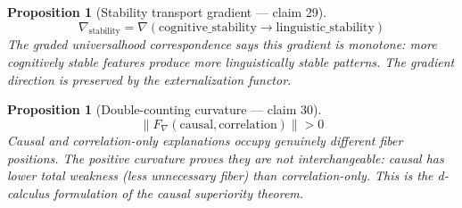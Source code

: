 \documentclass[11pt,a4paper]{article}
\newtheorem{proposition}[definition]{Proposition}
\begin{document}
\begin{proposition}[Stability transport gradient --- claim 29]
\label{prop:stability}
\[
  \nabla_{\text{stability}} = \nabla\left(\text{cognitive\_stability}
    \to \text{linguistic\_stability}\right)
\]
The graded universalhood correspondence says this gradient is monotone:
more cognitively stable features produce more linguistically stable
patterns. The gradient direction is preserved by the externalization
functor.
\end{proposition}

\begin{proposition}[Double-counting curvature --- claim 30]
\label{prop:double_curv}
\[
  \|F_\nabla(\text{causal}, \text{correlation})\| > 0
\]
Causal and correlation-only explanations occupy genuinely different
fiber positions. The positive curvature proves they are not
interchangeable: causal has lower total weakness (less unnecessary
fiber) than correlation-only. This is the d-calculus formulation of
the causal superiority theorem.
\end{proposition}
\end{document}
